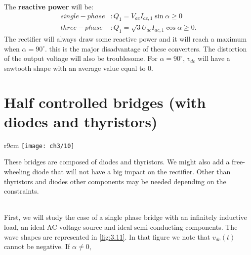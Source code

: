 						The \textbf{reactive power} will be: 
						\begin{equation}
						\begin{aligned}
						single-phase &: Q_1 = V_{ac}I_{ac,1}\sin \alpha \geq 0\\
						three-phase &: Q_1 = \sqrt{3}U_{ac}I_{ac,1}\cos \alpha \geq 0.
						\end{aligned}
						\end{equation}
						The rectifier will always draw some reactive power and it will reach a maximum when $\alpha = 90^\circ$. this is the major disadvantage of these converters. The distortion of the output voltage will also be troublesome. For $\alpha = 90^\circ$, $v_{dc}$ will have a sawtooth shape with an average value equal to 0. 
						
	\section{Half controlled bridges (with diodes and thyristors)}
		\begin{wrapfigure}[10]{r}{9cm}
		\vspace{-5mm}
		\texttt{[image: ch3/10]}
		\end{wrapfigure}
		These bridges are composed of diodes and thyristors. We might also add a free-wheeling diode that will not have a big impact on the rectifier. Other than thyristors and diodes other components may be needed depending on the constraints. 
		
		\ \\ First, we will study the case of a single phase bridge with an infinitely inductive load, an ideal AC voltage source and ideal semi-conducting components. The wave shapes are represented in \autoref{fig:3.11}. In that figure we note that $v_{dc}(t)$ cannot be negative. If $\alpha \neq 0$, 
		
		\ \\
		
